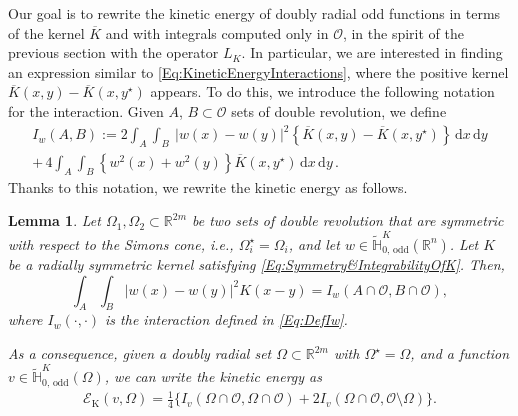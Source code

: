 \documentclass[12pt,reqno]{amsart}
\newtheorem{lemma}[theorem]{Lemma}
\theoremstyle{definition}
\theoremstyle{remark}
\newcommand{\con}[1]{\mathbb{#1}}
\newcommand{\R}{\con{R}} %
\renewcommand{\H}{\con{H}}
\newcommand{\ecal}{\mathcal{E}}
\newcommand{\ocal}{\mathcal{O}}
\renewcommand{\d}{\,\mathrm{d}} %
\numberwithin{equation}{section}
\begin{document}
Our goal is to rewrite the kinetic energy of doubly radial odd functions in terms of the kernel $\overline{K}$ and with integrals computed only in $\ocal$, in the spirit of the previous section with the operator $L_K$. In particular, we are interested in finding an expression similar to \eqref{Eq:KineticEnergyInteractions}, where the positive kernel $\overline{K}(x,y) - \overline{K}(x,y^\star)$ appears. To do this, we introduce the following notation for the interaction. Given $A$, $B\subset \ocal$ sets of double revolution, we define
\begin{equation}
\label{Eq:DefIw}
\begin{split}
I_w(A,B) := 2\int_A  \int_B  \ |w(x)-w(y)|^2 \left\{ \overline{K}(x,y) - \overline{K}(x,y^\star) \right\} \d x \d y  \\
+\, 4 \int_A  \int_B  \left\{w^2(x)+w^2(y)\right\} \overline{K}(x,y^\star) \d x \d y\,.
\end{split}
\end{equation}
Thanks to this notation, we rewrite the kinetic energy as follows.


\begin{lemma}
	\label{Lemma:ShortExpressionEnergy}
	Let $\Omega_1, \Omega_2 \subset \R^{2m}$ be two sets of double revolution that are symmetric with respect to the Simons cone, i.e., $\Omega_i^\star = \Omega_i$, and let $w\in \widetilde{\H}^K_{0,\, \mathrm{odd}}(\R^n)$. Let $K$ be a radially symmetric kernel satisfying \eqref{Eq:Symmetry&IntegrabilityOfK}. Then, 
	\begin{equation}
	\label{Eq:InteractionsEquality}
	\int_A \int_B |w(x)-w(y)|^2 K(x-y) = I_w(A\cap \ocal,B\cap \ocal),
	\end{equation}
	where $I_w(\cdot, \cdot)$ is the interaction defined in \eqref{Eq:DefIw}.
	
	As a consequence, given a doubly radial set $\Omega\subset \R^{2m}$ with $\Omega^\star = \Omega$, and a function $v\in \widetilde{\H}^K_{0,\, \mathrm{odd}}(\Omega)$, we can write the kinetic energy as
	\begin{align}
	\label{Eq:ShortExpressionEnergy}
	\ecal_\mathrm{K}(v, \Omega) = \frac{1}{4} \big \{I_v(\Omega\cap\ocal,\Omega\cap\ocal) +  2I_v(\Omega\cap\ocal,\ocal\setminus\Omega) \big \}.
	\end{align}
	
\end{lemma}
\end{document}
